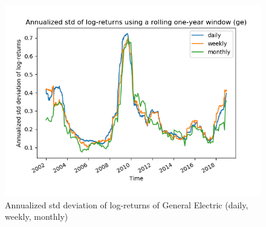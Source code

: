 \documentclass[10pt]{article}
\newenvironment{exercise}[2][Exercise]{\begin{trivlist}
  \item[\hskip \labelsep {\bfseries #1}\hskip \labelsep {\bfseries #2.}]}{\end{trivlist}}
\begin{document}
\begin{exercise}{4}
\begin{figure}[H]
		\centering
		\includegraphics[scale=0.5]{Figures/problem4d_std_ge.png}	
		\caption{Annualized std deviation of log-returns of General Electric (daily, weekly, monthly)}	
		\label{fig:problem3d_std_ge}
	
	\end{figure} 
 
  \end{exercise} 


\end{document}
